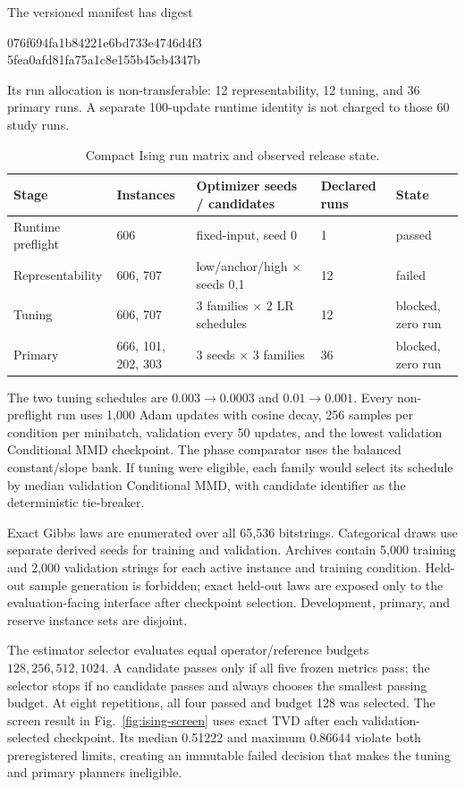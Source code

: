 The versioned manifest has digest
\begin{center}
\small\ttfamily
076f694fa1b84221e6bd733e4746d4f3\\
5fea0afd81fa75a1c8e155b45cb4347b
\end{center}
Its run allocation is non-transferable: 12 representability, 12 tuning, and 36
primary runs.  A separate 100-update runtime identity is not charged to those
60 study runs.

\begin{table}[t]
\centering
\caption{Compact Ising run matrix and observed release state.}
\label{tab:ising-plan}
\begin{tabular}{p{3.2cm}p{2.5cm}p{4.4cm}p{1.8cm}p{2.3cm}}
\toprule
Stage & Instances & Optimizer seeds / candidates & Declared runs & State \\
\midrule
Runtime preflight & 606 & fixed-input, seed 0 & 1 & passed \\
Representability & 606, 707 & low/anchor/high $\times$ seeds 0,1 & 12 & failed \\
Tuning & 606, 707 & 3 families $\times$ 2 LR schedules & 12 & blocked, zero run \\
Primary & 666, 101, 202, 303 & 3 seeds $\times$ 3 families & 36 & blocked, zero run \\
\bottomrule
\end{tabular}
\end{table}

The two tuning schedules are $0.003\rightarrow0.0003$ and
$0.01\rightarrow0.001$.  Every non-preflight run uses 1,000 Adam updates with
cosine decay, 256 samples per condition per minibatch, validation every 50
updates, and the lowest validation Conditional MMD checkpoint.  The phase
comparator uses the balanced constant/slope bank.  If tuning were eligible,
each family would select its schedule by median validation Conditional MMD,
with candidate identifier as the deterministic tie-breaker.

Exact Gibbs laws are enumerated over all 65,536 bitstrings.  Categorical draws
use separate derived seeds for training and validation.  Archives contain
5,000 training and 2,000 validation strings for each active instance and
training condition.  Held-out sample generation is forbidden; exact held-out
laws are exposed only to the evaluation-facing interface after checkpoint
selection.  Development, primary, and reserve instance sets are disjoint.

The estimator selector evaluates equal operator/reference budgets
$128,256,512,1024$.  A candidate passes only if all five frozen metrics pass;
the selector stops if no candidate passes and always chooses the smallest
passing budget.  At eight repetitions, all four passed and budget 128 was
selected.  The screen result in Fig.~\ref{fig:ising-screen} uses exact TVD after
each validation-selected checkpoint.  Its median 0.51222 and maximum 0.86644
violate both preregistered limits, creating an immutable failed decision that
makes the tuning and primary planners ineligible.

